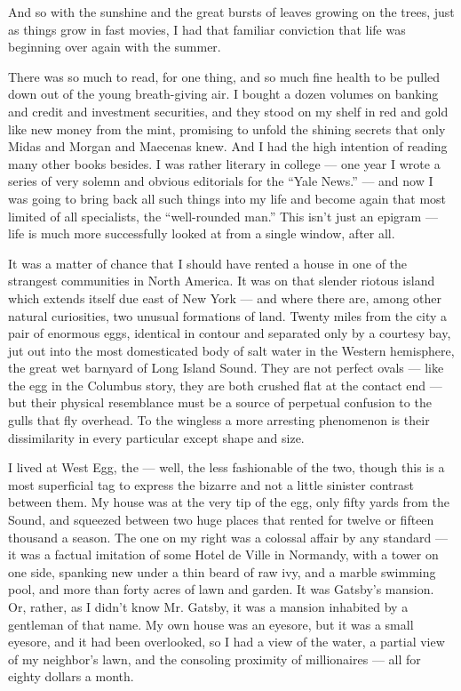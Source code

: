 \documentclass{znotebook}
\begin{document}
And so with the sunshine and the great bursts of leaves growing on the trees, just as things grow in fast movies, I had that familiar conviction that life was beginning over again with the summer.

There was so much to read, for one thing, and so much fine health to be pulled down out of the young breath-giving air. I bought a dozen volumes on banking and credit and investment securities, and they stood on my shelf in red and gold like new money from the mint, promising to unfold the shining secrets that only Midas and Morgan and Maecenas knew. And I had the high intention of reading many other books besides. I was rather literary in college ---{} one year I wrote a series of very solemn and obvious editorials for the ``Yale News.'' ---{} and now I was going to bring back all such things into my life and become again that most limited of all specialists, the ``well-rounded man.'' This isn't just an epigram ---{} life is much more successfully looked at from a single window, after all.

It was a matter of chance that I should have rented a house in one of the strangest communities in North America. It was on that slender riotous island which extends itself due east of New York ---{} and where there are, among other natural curiosities, two unusual formations of land. Twenty miles from the city a pair of enormous eggs, identical in contour and separated only by a courtesy bay, jut out into the most domesticated body of salt water in the Western hemisphere, the great wet barnyard of Long Island Sound. They are not perfect ovals ---{} like the egg in the Columbus story, they are both crushed flat at the contact end ---{} but their physical resemblance must be a source of perpetual confusion to the gulls that fly overhead. To the wingless a more arresting phenomenon is their dissimilarity in every particular except shape and size.

I lived at West Egg, the ---{} well, the less fashionable of the two, though this is a most superficial tag to express the bizarre and not a little sinister contrast between them. My house was at the very tip of the egg, only fifty yards from the Sound, and squeezed between two huge places that rented for twelve or fifteen thousand a season. The one on my right was a colossal affair by any standard ---{} it was a factual imitation of some Hotel de Ville in Normandy, with a tower on one side, spanking new under a thin beard of raw ivy, and a marble swimming pool, and more than forty acres of lawn and garden. It was Gatsby's mansion. Or, rather, as I didn't know Mr. Gatsby, it was a mansion inhabited by a gentleman of that name. My own house was an eyesore, but it was a small eyesore, and it had been overlooked, so I had a view of the water, a partial view of my neighbor's lawn, and the consoling proximity of millionaires ---{} all for eighty dollars a month.
\end{document}
